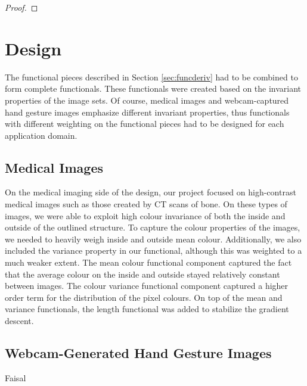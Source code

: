 \documentclass{article}
\begin{document}
			\begin{proof}
				
			\end{proof}

	\section{Design}
	The functional pieces described in Section \ref{sec:funcderiv} had to be combined to form complete functionals. These functionals were created based on the invariant properties of the image sets. Of course, medical images and webcam-captured hand gesture images emphasize different invariant properties, thus functionals with different weighting on the functional pieces had to be designed for each application domain.

		\subsection{Medical Images}
		On the medical imaging side of the design, our project focused on high-contrast medical images such as those created by CT scans of bone. On these types of images, we were able to exploit high colour invariance of both the inside and outside of the outlined structure. To capture the colour properties of the images, we needed to heavily weigh inside and outside mean colour. Additionally, we also included the variance property in our functional, although this was weighted to a much weaker extent. The mean colour functional component captured the fact that the average colour on the inside and outside stayed relatively constant between images. The colour variance functional component captured a higher order term for the distribution of the pixel colours. On top of the mean and variance functionals, the length functional was added to stabilize the gradient descent.



		\subsection{Webcam-Generated Hand Gesture Images}
			Faisal
\end{document}
